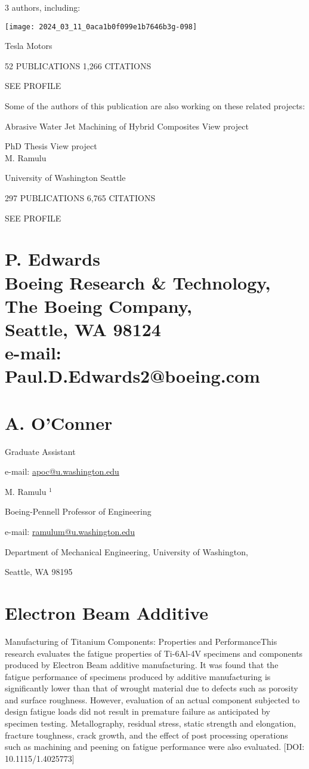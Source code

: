 \documentclass[10pt]{article}
\begin{document}
3 authors, including:

\begin{center}
\texttt{[image: 2024\_03\_11\_0aca1b0f099e1b7646b3g-098]}
\end{center}

Tesla Motors

52 PUBLICATIONS 1,266 CITATIONS

SEE PROFILE

Some of the authors of this publication are also working on these related projects:

Abrasive Water Jet Machining of Hybrid Composites View project

PhD Thesis View project\\
M. Ramulu

University of Washington Seattle

297 PUBLICATIONS 6,765 CITATIONS

SEE PROFILE

\section*{P. Edwards \\
 Boeing Research \& Technology, \\
 The Boeing Company, \\
 Seattle, WA 98124 \\
 e-mail: Paul.D.Edwards2@boeing.com}
\section*{A. O'Conner}
Graduate Assistant

e-mail: \href{mailto:apoc@u.washington.edu}{apoc@u.washington.edu}

M. Ramulu ${ }^{1}$

Boeing-Pennell Professor of Engineering

e-mail: \href{mailto:ramulum@u.washington.edu}{ramulum@u.washington.edu}

Department of Mechanical Engineering, University of Washington,

Seattle, WA 98195

\section*{Electron Beam Additive}
 Manufacturing of Titanium Components: Properties and PerformanceThis research evaluates the fatigue properties of Ti-6Al-4V specimens and components produced by Electron Beam additive manufacturing. It was found that the fatigue performance of specimens produced by additive manufacturing is significantly lower than that of wrought material due to defects such as porosity and surface roughness. However, evaluation of an actual component subjected to design fatigue loads did not result in premature failure as anticipated by specimen testing. Metallography, residual stress, static strength and elongation, fracture toughness, crack growth, and the effect of post processing operations such as machining and peening on fatigue performance were also evaluated. [DOI: 10.1115/1.4025773]
\end{document}
